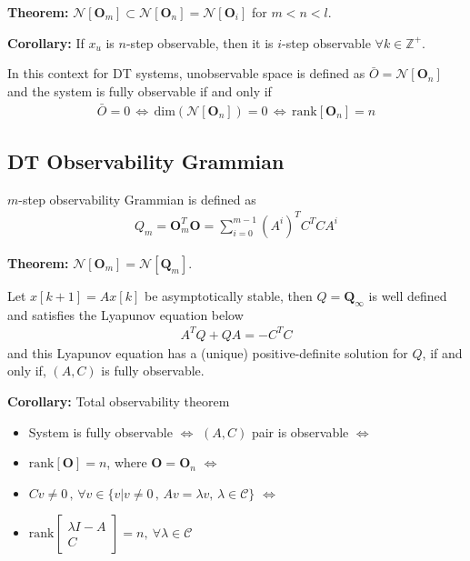 \documentclass[twoside]{article}
\begin{document}
\textbf{Theorem:} $\mathcal{N}[ \mathbf{O}_m ] \subset \mathcal{N}[ \mathbf{O}_n ] = \mathcal{N}[ \mathbf{O}_i ]$ for $m < n < l$.

\textbf{Corollary:} If $x_u$ is $n$-step observable, then it is $i$-step observable $\forall k \in \mathbb{Z}^+$.

In this context for DT systems, unobservable space is defined as $\bar{O} = \mathcal{N}[ \mathbf{O}_n ]$
and the system is fully observable if and only if 
\begin{align*}
 \bar{O} = {0} \, \iff \, \mathrm{dim}( \mathcal{N}[ \mathbf{O}_n ] ) = 0 \, \iff \,
 \mathrm{rank}[ \mathbf{O}_n ] = n
\end{align*}

\subsection{DT Observability Grammian}

$m$-step observability Grammian is defined as
\begin{align*}
 Q_m = \mathbf{O}_m^T \mathbf{O} = \sum\limits_{i=0}^{m-1} (A^i)^T C^T C A^i 
\end{align*}

\textbf{Theorem:} $\mathcal{N}[ \mathbf{O}_m ] = \mathcal{N}[ \mathbf{Q}_m ]$.

Let $x[k+1] = A x[k]$ be asymptotically stable, then $Q = \mathbf{Q}_{\infty}$ is well defined 
and satisfies the Lyapunov equation below
%
\begin{align*}
 A^T Q + Q A = - C^T C    
\end{align*}
%
and this Lyapunov equation has a (unique) positive-definite solution for $Q$,
if and only if, $(A,C)$ is fully observable.

\vspace{6pt}

\textbf{Corollary:} Total observability theorem
\begin{itemize}
 \item System is fully observable $\iff$ $(A,C)$ pair is observable $\iff$
 \item $\mathrm{rank}[\mathbf{O}] = n$, where $\mathbf{O} = \mathbf{O}_n$ $\iff$ 
 \item $C v \neq 0 \, , \, \forall v \in \lbrace v | v \neq 0 \, , \, A v = \lambda v , \, \lambda \in \mathcal{C} \rbrace$ $\iff$ 
 \item $\mathrm{rank} \left[ \begin{array}{c} \lambda I - A \\ \hline C \end{array} \right] = n , \ \forall \lambda \in \mathcal{C}$
\end{itemize}



\end{document}
